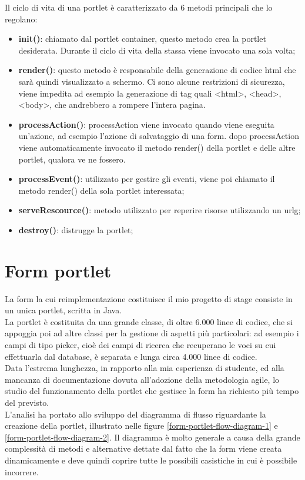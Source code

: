 Il ciclo di vita di una \gls{portlet} è caratterizzato da 6 metodi principali che lo regolano:
\begin{itemize}
	\item \textbf{init()}: chiamato dal portlet container, questo metodo crea la \gls{portlet} desiderata. Durante il ciclo di vita della stassa viene invocato una sola volta;
	\item \textbf{render()}: questo metodo è responsabile della generazione di codice \gls{html} che sarà quindi visualizzato a schermo. Ci sono alcune restrizioni di sicurezza, viene impedita ad esempio la generazione di tag quali <html>, <head>, <body>, che andrebbero a rompere l'intera pagina.
	\item \textbf{processAction()}: processAction viene invocato quando viene eseguita un'azione, ad esempio l'azione di salvataggio di una form. dopo processAction viene automaticamente invocato il metodo render() della \gls{portlet} e delle altre \gls{portlet}, qualora ve ne fossero.
	\item \textbf{processEvent()}: utilizzato per gestire gli eventi, viene poi chiamato il metodo render() della sola \gls{portlet} interessata;
	\item \textbf{serveRescource()}: metodo utilizzato per reperire risorse utilizzando un \gls{urlg};
	\item \textbf{destroy()}: distrugge la \gls{portlet};
\end{itemize}	
\newpage
\section{Form portlet}
La form la cui reimplementazione costituisce il mio progetto di stage consiste in un unica \gls{portlet}, scritta in Java. \\
La \gls{portlet} è costituita da una grande classe, di oltre 6.000 linee di codice, che si appoggia poi ad altre classi per la gestione di aspetti più particolari: ad esempio i campi di tipo picker, cioè dei campi di ricerca che recuperano le voci su cui effettuarla dal database, è separata e lunga circa 4.000 linee di codice.\\
Data l'estrema lunghezza, in rapporto alla mia esperienza di studente, ed alla mancanza di documentazione dovuta all'adozione della metodologia agile, lo studio del funzionamento della \gls{portlet} che gestisce la form ha richiesto più tempo del previsto. \\ 
L'analisi ha portato allo sviluppo del diagramma di flusso riguardante la creazione della \gls{portlet}, illustrato nelle figure \ref{form-portlet-flow-diagram-1} e \ref{form-portlet-flow-diagram-2}. Il diagramma è molto generale a causa della grande complessità di metodi e alternative dettate dal fatto che la form viene creata dinamicamente e deve quindi coprire tutte le possibili casistiche in cui è possibile incorrere.\\

